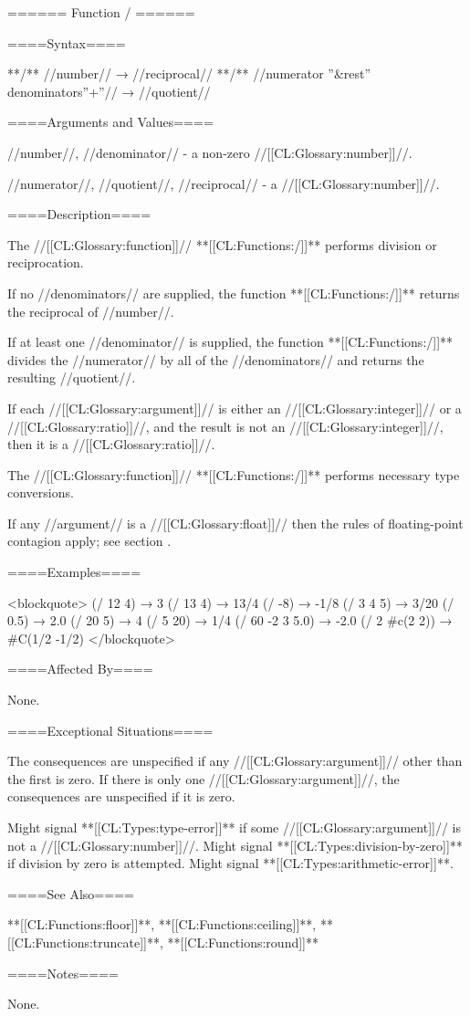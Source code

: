 ====== Function / ======

====Syntax====

**/** //number// → //reciprocal// **/** //numerator ''&rest'' denominators''+''// → //quotient//

====Arguments and Values====

//number//, //denominator// - a non-zero //[[CL:Glossary:number]]//.

//numerator//, //quotient//, //reciprocal// - a //[[CL:Glossary:number]]//.

====Description====

The //[[CL:Glossary:function]]// **[[CL:Functions:/]]** performs division or reciprocation.

If no //denominators// are supplied, the function **[[CL:Functions:/]]** returns the reciprocal of //number//.

If at least one //denominator// is supplied, the function **[[CL:Functions:/]]** divides the //numerator// by all of the //denominators// and returns the resulting //quotient//.

If each //[[CL:Glossary:argument]]// is either an //[[CL:Glossary:integer]]// or a //[[CL:Glossary:ratio]]//, and the result is not an //[[CL:Glossary:integer]]//, then it is a //[[CL:Glossary:ratio]]//.

The //[[CL:Glossary:function]]// **[[CL:Functions:/]]** performs necessary type conversions.

If any //argument// is a //[[CL:Glossary:float]]// then the rules of floating-point contagion apply; see section {\secref\FloatingPointComputations}.

====Examples====

<blockquote> (/ 12 4) → 3 (/ 13 4) → 13/4 (/ -8) → -1/8 (/ 3 4 5) → 3/20 (/ 0.5) → 2.0 (/ 20 5) → 4 (/ 5 20) → 1/4 (/ 60 -2 3 5.0) → -2.0 (/ 2 #c(2 2)) → #C(1/2 -1/2) </blockquote>

====Affected By====

None.

====Exceptional Situations====

The consequences are unspecified if any //[[CL:Glossary:argument]]// other than the first is zero. If there is only one //[[CL:Glossary:argument]]//, the consequences are unspecified if it is zero.

Might signal **[[CL:Types:type-error]]** if some //[[CL:Glossary:argument]]// is not a //[[CL:Glossary:number]]//. Might signal **[[CL:Types:division-by-zero]]** if division by zero is attempted. Might signal **[[CL:Types:arithmetic-error]]**.

====See Also====

**[[CL:Functions:floor]]**, **[[CL:Functions:ceiling]]**, **[[CL:Functions:truncate]]**, **[[CL:Functions:round]]**

====Notes====

None.

